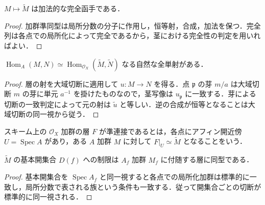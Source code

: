 \begin{prop}[付随層函手の完全性]
$M\mapsto\widetilde M$ は加法的な完全函手である．
\end{prop}
\begin{proof}
加群準同型は局所分数の分子に作用し，恒等射，合成，加法を保つ．完全列は各点での局所化によって完全であるから，茎における完全性の判定を用いればよい．
\end{proof}
\begin{prop}[付随層函手の充満忠実性]
$\operatorname{Hom}_A(M,N)\simeq\operatorname{Hom}_{\mathcal O_X}(\widetilde M,\widetilde N)$ なる自然な全単射がある．
\end{prop}
\begin{proof}
層の射を大域切断に適用して $u:M\to N$ を得る．点 $\mathfrak p$ の芽 $m/a$ は大域切断 $m$ の芽に単元 $a^{-1}$ を掛けたものなので，茎写像は $u_{\mathfrak p}$ に一致する．芽による切断の一致判定によって元の射は $\widetilde u$ と等しい．逆の合成が恒等となることは大域切断の同一視から従う．
\end{proof}
\begin{defn}[準連接層]
スキーム上の $\mathcal O_X$ 加群の層 $F$ が準連接であるとは，各点にアフィン開近傍 $U=\operatorname{Spec}A$ があり，ある $A$ 加群 $M$ に対して $F|_U\simeq\widetilde M$ となることをいう．
\end{defn}
\begin{prop}[基本開集合への制限]
$\widetilde M$ の基本開集合 $D(f)$ への制限は $A_f$ 加群 $M_f$ に付随する層に同型である．
\end{prop}
\begin{proof}
基本開集合を $\operatorname{Spec}A_f$ と同一視すると各点での局所化加群は標準的に一致し，局所分数で表される族という条件も一致する．従って開集合ごとの切断が標準的に同一視される．
\end{proof}
